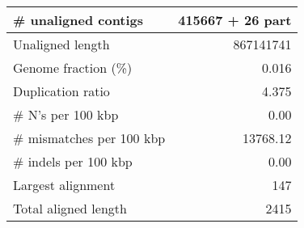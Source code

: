\documentclass[12pt,a4paper]{article}
\begin{document}
\begin{table}[ht]
\begin{center}
\begin{tabular}{|l*{1}{|r}|}
\# unaligned contigs & 415667 + 26 part \\ \hline
Unaligned length & 867141741 \\ \hline
Genome fraction (\%) & 0.016 \\ \hline
Duplication ratio & 4.375 \\ \hline
\# N's per 100 kbp & 0.00 \\ \hline
\# mismatches per 100 kbp & 13768.12 \\ \hline
\# indels per 100 kbp & 0.00 \\ \hline
Largest alignment & 147 \\ \hline
Total aligned length & 2415 \\ \hline
\end{tabular}
\end{center}
\end{table}
\end{document}
